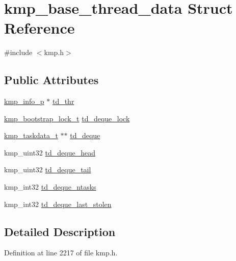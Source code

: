 \hypertarget{structkmp__base__thread__data}{\section{kmp\-\_\-base\-\_\-thread\-\_\-data Struct Reference}
\label{structkmp__base__thread__data}
}


{\ttfamily \#include $<$kmp.\-h$>$}

\subsection*{Public Attributes}
\begin{DoxyCompactItemize}
\item 
\hyperlink{kmp_8h_ac18028528c26006f57fea477167d447e}{kmp\-\_\-info\-\_\-p} $\ast$ \hyperlink{structkmp__base__thread__data_accbff1b277142a1dfa82c660147acdfe}{td\-\_\-thr}
\item 
\hyperlink{kmp__lock_8h_a480dc901a9c2be2a41f0ab8c381e94a7}{kmp\-\_\-bootstrap\-\_\-lock\-\_\-t} \hyperlink{structkmp__base__thread__data_afa4a079da04b5b91f938163730476253}{td\-\_\-deque\-\_\-lock}
\item 
\hyperlink{kmp_8h_af73aa077ec760ca83750f8144a5e65fb}{kmp\-\_\-taskdata\-\_\-t} $\ast$$\ast$ \hyperlink{structkmp__base__thread__data_a2617b7a1131d390a44e66b6fd7e27b59}{td\-\_\-deque}
\item 
kmp\-\_\-uint32 \hyperlink{structkmp__base__thread__data_a13c57d375dcf1c348424a30ff4ec1342}{td\-\_\-deque\-\_\-head}
\item 
kmp\-\_\-uint32 \hyperlink{structkmp__base__thread__data_a11c677b0d6ffa6e936cf0cce3c2536c3}{td\-\_\-deque\-\_\-tail}
\item 
kmp\-\_\-int32 \hyperlink{structkmp__base__thread__data_a9db07e6f1d2e2ddff722b8d8ee110abd}{td\-\_\-deque\-\_\-ntasks}
\item 
kmp\-\_\-int32 \hyperlink{structkmp__base__thread__data_ac5ff1b2c89bea039db24f574ad06b3f4}{td\-\_\-deque\-\_\-last\-\_\-stolen}
\end{DoxyCompactItemize}


\subsection{Detailed Description}


Definition at line 2217 of file kmp.\-h.



